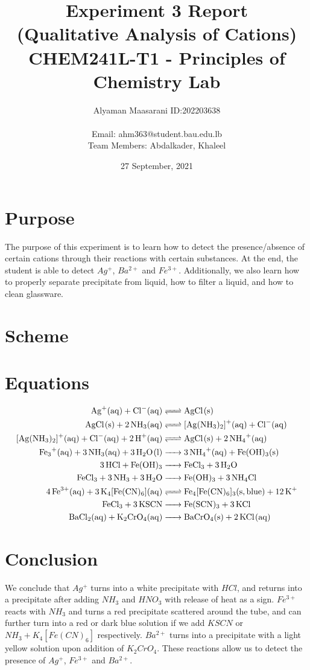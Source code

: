 \documentclass[11pt]{article}
\author{Alyaman Maasarani ID:202203638 \\ \\
  \small{ Email: ahm363@student.bau.edu.lb } \\
\small{Team Members: Abdalkader, Khaleel}}
\date{27 September, 2021}
\title{Experiment 3 Report \\ (Qualitative Analysis of Cations) \\ \small{ CHEM241L-T1 -
  Principles of Chemistry Lab }}
\begin{document}
\maketitle
\tableofcontents


\section{Purpose}
\label{sec:org33dd161}
The purpose of this experiment is to learn how to detect the presence/absence of certain cations through their reactions with certain substances. At the end, the student is able to detect \(Ag^{+}\), \(Ba^{2+}\) and \(Fe^{3+}\). Additionally, we also learn how to properly separate precipitate from liquid, how to filter a liquid, and how to clean glassware.

\section{Scheme}
\label{sec:org9afc1ef}
\begin{center}
  \makebox[0pt]{\scalebox{0.8}{}}
\end{center}


\section{Equations}
\begin{align}
  \ce{Ag^{+}(aq) + Cl^{-}(aq) &<=> AgCl(s)} \\
  \ce{AgCl(s) + 2NH3(aq) &<=> [Ag(NH3)2]^{+}(aq) + Cl-(aq)}\\
  \ce{[Ag(NH3)2]+(aq) + Cl^{-}(aq) + 2H^{+}(aq) &<=> AgCl(s) + 2NH4^{+}(aq) }\\
  \ce{ Fe3+(aq) + 3NH3(aq) + 3H2O(l) &-> 3NH4+(aq) + Fe(OH)3(s) } \\
  \ce{3HCl + Fe(OH)3 &-> FeCl3 + 3 H2O}\\
  \ce{FeCl3 + 3NH3 + 3H2O &-> Fe(OH)3 + 3NH4Cl}\\
  \ce{4Fe^{3+}(aq) + 3K4[Fe(CN)6](aq) &<=> Fe4[Fe(CN)6]3(s, blue) + 12K+}\\
  \ce{FeCl3 + 3KSCN &-> Fe(SCN)3 + 3KCl}\\
  \ce{BaCl2(aq) + K2CrO4(aq) &-> BaCrO4(s) + 2KCl(aq)}
\end{align}

\section{Conclusion}
\label{sec:orgf90cc25}
We conclude that \(Ag^+\) turns into a white precipitate with \(HCl\), and returns into a precipitate after adding \(NH_3\) and \(HNO_3\) with release of heat as a sign. \(Fe^{3+}\) reacts with \(NH_3\) and turns a red precipitate scattered around the tube, and can further turn into a red or dark blue solution if we add \(KSCN\) or \(NH_3 + K_4[Fe(CN)_6]\) respectively. \(Ba^{2+}\) turns into a precipitate with a light yellow solution upon addition of \(K_2CrO_4\). These reactions allow us to detect the presence of \(Ag^+\), \(Fe^{3+}\) and \(Ba^{2+}\).
\end{document}
